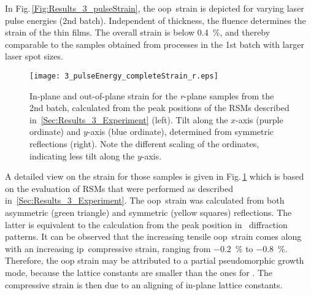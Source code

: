 In Fig.\,\ref{Fig:Results_3_pulseStrain}, the \gls{oop}\ strain is depicted for varying laser pulse energies (2nd batch).
Independent of thickness, the fluence determines the strain of the thin films.
The overall strain is below \qty{0.4}{\percent}, and thereby comparable to the samples obtained from processes in the 1st batch with larger laser spot sizes.
\begin{figure}
    \centering
    \texttt{[image: 3\_pulseEnergy\_completeStrain\_r.eps]}
    \caption{
        In-plane and out-of-plane strain for the \textit{r}-plane samples from the 2nd batch, calculated from the peak positions of the \glspl{RSM} described in~\ref{Sec:Results_3_Experiment} (left).
        Tilt along the $x$-axis (purple ordinate) and $y$-axis (blue ordinate), determined from symmetric reflections (right).
        Note the different scaling of the ordinates, indicating less tilt along the $y$-axis.
    }
    \label{Fig:Results_3_pulse_r_StrainTilt}
\end{figure}
A detailed view on the strain for those samples is given in Fig.\,\ref{Fig:Results_3_pulse_r_StrainTilt} which is based on the evaluation of \glspl{RSM} that were performed as described in~\ref{Sec:Results_3_Experiment}.
The \gls{oop}\ strain was calculated from both asymmetric (green triangle) and symmetric (yellow squares) reflections.
The latter is equivalent to the calculation from the peak position in \thetaomega\ diffraction patterns.
It can be observed that the increasing tensile \gls{oop}\ strain comes along with an increasing \gls{ip}\ compressive strain, ranging from \qty{-0.2}{\percent} to \qty{-0.8}{\percent}.
Therefore, the \gls{oop} strain may be attributed to a partial pseudomorphic growth mode, because the  lattice constants are smaller than the ones for \cro.
The compressive strain is then due to an aligning of in-plane lattice constants.


